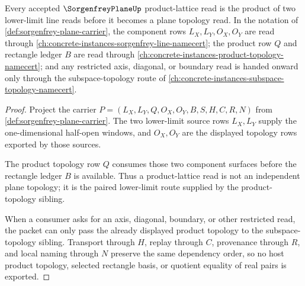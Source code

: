 \begin{theorem}
\label{thm:sorgenfrey-plane-lower-limit-product-lattice-link}
Every accepted $\SorgenfreyPlaneUp$ product-lattice read is the product of two lower-limit line reads before it becomes a plane topology read. In the notation of \autoref{def:sorgenfrey-plane-carrier}, the component rows $L_X,L_Y,O_X,O_Y$ are read through \autoref{ch:concrete-instances-sorgenfrey-line-namecert}; the product row $Q$ and rectangle ledger $B$ are read through \autoref{ch:concrete-instances-product-topology-namecert}; and any restricted axis, diagonal, or boundary read is handed onward only through the subspace-topology route of \autoref{ch:concrete-instances-subspace-topology-namecert}.
\end{theorem}
\begin{proof}
Project the carrier $P=(L_X,L_Y,Q,O_X,O_Y,B,S,H,C,R,N)$ from \autoref{def:sorgenfrey-plane-carrier}. The two lower-limit source rows $L_X,L_Y$ supply the one-dimensional half-open windows, and $O_X,O_Y$ are the displayed topology rows exported by those sources.

The product topology row $Q$ consumes those two component surfaces before the rectangle ledger $B$ is available. Thus a product-lattice read is not an independent plane topology; it is the paired lower-limit route supplied by the product-topology sibling.

When a consumer asks for an axis, diagonal, boundary, or other restricted read, the packet can only pass the already displayed product topology to the subspace-topology sibling. Transport through $H$, replay through $C$, provenance through $R$, and local naming through $N$ preserve the same dependency order, so no host product topology, selected rectangle basis, or quotient equality of real pairs is exported.
\end{proof}
